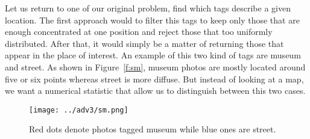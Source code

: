 Let us return to one of our original problem, find which tags describe a given
location. The first approach would to filter this  tags to keep
only those that are enough concentrated at one position and reject those that
too uniformly distributed. After that, it would simply be a matter of
returning those that appear in the place of interest. An example of this two
kind of tags are \textsf{museum} and \textsf{street}. As shown in
Figure~\vref{f:sm}, \textsf{museum} photos are mostly located around five or
six points whereas \textsf{street} is more diffuse. But instead of looking at
a map, we want a numerical statistic that allow us to distinguish between this
two cases.

\begin{figure}[hbtp]
	\centering
	\texttt{[image: ../adv3/sm.png]}
	\caption{Red dots denote photos tagged \textsf{museum} while blue ones are
	\textsf{street}.\label{f:sm}}
\end{figure}
